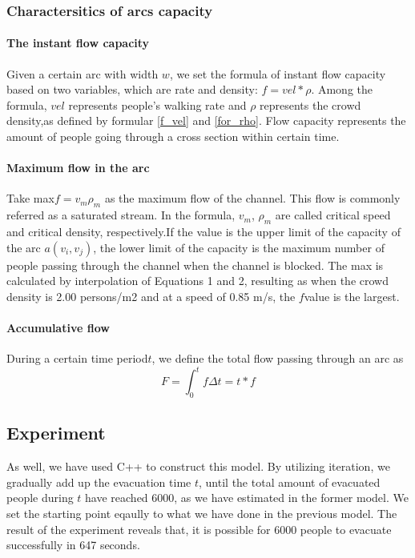 \documentclass{mcmthesis}
\begin{document}
\subsubsection{Charactersitics of arcs capacity}

\paragraph{The instant flow capacity }
      Given a certain arc with width $w$, we set the  formula of instant flow capacity based on two variables, which are  rate and density: $f=vel * \rho$.  Among the formula, $vel$ represents people's walking rate and $\rho$ represents the crowd density,as defined by formular \ref{f_vel} and \ref{for_rho}. Flow capacity represents the amount of people going through a cross section within certain time.
      
\paragraph{Maximum flow in the arc }

Take max$f=v_m\rho_m$ as the maximum flow of the channel. This flow is commonly referred as a saturated stream. In the formula, $v_m$, $\rho_m$ are called critical speed and critical density, respectively.If the value is the upper limit of the capacity of the arc $a(v_i,v_j)$, the lower limit of the capacity is the maximum number of people passing through the channel when the channel is blocked. The max is calculated by interpolation of Equations 1 and 2, resulting as when the crowd density is 2.00 persons/m2 and at a speed of 0.85 m/s, the $f​$value is the largest.

\paragraph{Accumulative flow}
During a certain time period$t$, we define the total flow passing through an arc as 
$$
F = \int _{0}^{t} f \Delta t = t * f
$$

\subsection{Experiment}

As well, we have used C++ to construct this model. By utilizing iteration, we gradually add up the evacuation time $t$, until the total amount of evacuated people during $t$ have reached 6000, as we have estimated in the former model. We set the starting point eqaully to what we have done in the previous model.
The result of the experiment reveals that, it is possible for 6000 people to evacuate successfully in 647 seconds.
\end{document}
